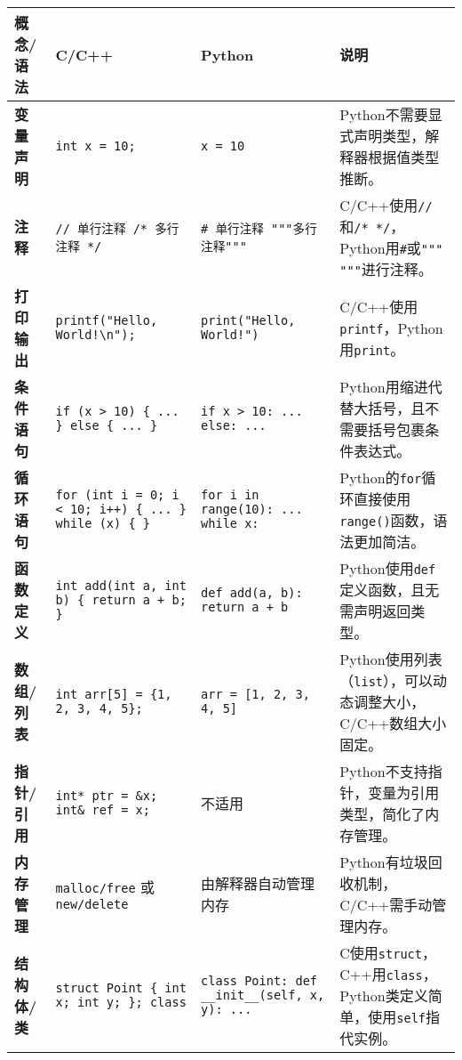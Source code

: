 \begin{longtable}{|p{1.7cm}|p{3.8cm}|p{3.8cm}|p{4cm}|}
    \hline
    \textbf{概念/语法} & \textbf{C/C++} & \textbf{Python} & \textbf{说明} \\
    \hline
    \textbf{变量声明} & \texttt{int x = 10;} & \texttt{x = 10} & Python不需要显式声明类型，解释器根据值类型推断。 \\
    \hline
    \textbf{注释} & \texttt{// 单行注释 \newline /* 多行注释 */} & \texttt{\# 单行注释 \newline """多行注释"""} & C/C++使用\texttt{//}和\texttt{/* */}，Python用\texttt{\#}或\texttt{""" """}进行注释。 \\
    \hline
    \textbf{打印输出} & \texttt{printf("Hello, World!\textbackslash n");} & \texttt{print("Hello, World!")} & C/C++使用\texttt{printf}，Python用\texttt{print}。 \\
    \hline
    \textbf{条件语句} & \texttt{if (x > 10) \{ ... \} else \{ ... \}} & \texttt{if x > 10: ... else: ...} & Python用缩进代替大括号，且不需要括号包裹条件表达式。 \\
    \hline
    \textbf{循环语句} & \texttt{for (int i = 0; i < 10; i++) \{ ... \} \newline while (x) \{ \}} & \texttt{for i in range(10): ... \newline while x:} & Python的\texttt{for}循环直接使用\texttt{range()}函数，语法更加简洁。 \\
    \hline
    \textbf{函数定义} & \texttt{int add(int a, int b) \{ return a + b; \}} & \texttt{def add(a, b): return a + b} & Python使用\texttt{def}定义函数，且无需声明返回类型。 \\
    \hline
    \textbf{数组/列表} & \texttt{int arr[5] = \{1, 2, 3, 4, 5\};} & \texttt{arr = [1, 2, 3, 4, 5]} & Python使用列表（\texttt{list}），可以动态调整大小，C/C++数组大小固定。 \\
    \hline
    \textbf{指针/引用} & \texttt{int* ptr = \&x; \newline int\& ref = x;} & 不适用 & Python不支持指针，变量为引用类型，简化了内存管理。 \\
    \hline
    \textbf{内存管理} & \texttt{malloc/free} 或 \texttt{new/delete} & 由解释器自动管理内存 & Python有垃圾回收机制，C/C++需手动管理内存。 \\
    \hline
    \textbf{结构体/类} & \texttt{struct Point \{ int x; int y; \}; \newline class} & \texttt{class Point: \newline def \_\_init\_\_(self, x, y): ...} & C使用\texttt{struct}，C++用\texttt{class}，Python类定义简单，使用\texttt{self}指代实例。 \\

\end{longtable}
